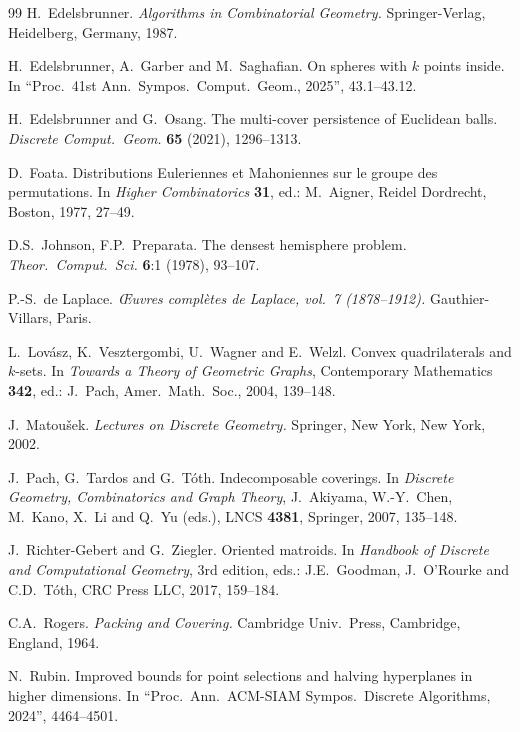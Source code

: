 \documentclass[10pt,a4paper]{article}
\theoremstyle{plain}
\begin{document}
\begin{thebibliography}{99}
{\sc H.\ Edelsbrunner.}
\emph{Algorithms in Combinatorial Geometry.}
Springer-Verlag, Heidelberg, Germany, 1987.

{\sc H.\ Edelsbrunner, A.\ Garber and M.\ Saghafian.}
On spheres with $k$ points inside.
In ``Proc.\ 41st Ann.\ Sympos.\ Comput.\ Geom., 2025'', 43.1--43.12.

{\sc H.\ Edelsbrunner and G.\ Osang.}
The multi-cover persistence of Euclidean balls.
\emph{Discrete Comput.\ Geom.} {\bf 65} (2021), 1296--1313.

{\sc D.\ Foata.}
Distributions Euleriennes et Mahoniennes sur le groupe des permutations.
In \emph{Higher Combinatorics} {\bf 31}, ed.: M.\ Aigner, Reidel Dordrecht, Boston, 1977, 27--49.

{\sc D.S.\ Johnson, F.P.\ Preparata.}
The densest hemisphere problem. \emph{Theor.\ Comput.\ Sci.} {\bf 6}:1 (1978), 93--107.


{\sc P.-S.\ de Laplace.} 
\emph{{\OE}uvres compl\`etes de Laplace, vol.\ 7 (1878--1912).} Gauthier-Villars, Paris.

{\sc L.\ Lov\'asz, K.\ Vesztergombi, U.\ Wagner and E.\ Welzl.} Convex quadrilaterals and $k$-sets.
In \emph{Towards a Theory of Geometric Graphs}, Contemporary Mathematics {\bf 342}, ed.: J.\ Pach, Amer.\ Math.\ Soc., 2004,  139--148.

{\sc J.\ Matou\v{s}ek.}
\emph{Lectures on Discrete Geometry.}
Springer, New York, New York, 2002.

{\sc J.\ Pach, G.\ Tardos and G.\ T\'{o}th.}
Indecomposable coverings.
In \emph{Discrete Geometry, Combinatorics and Graph Theory}, J.\ Akiyama, W.-Y.\ Chen, M.\ Kano, X.\ Li and Q.\ Yu (eds.), LNCS {\bf 4381}, Springer, 2007, 135--148.

{\sc J.\ Richter-Gebert and G.\ Ziegler.}
Oriented matroids.
In \emph{Handbook of Discrete and Computational Geometry}, 3rd edition, eds.: J.E.\ Goodman, J.\ O'Rourke and C.D.\ T\'oth, CRC Press LLC, 2017, 159--184.

{\sc C.A.\ Rogers.}
\emph{Packing and Covering.}
Cambridge Univ.\ Press, Cambridge, England, 1964.

{\sc N.\ Rubin.}
Improved bounds for point selections and halving hyperplanes in higher dimensions.
In ``Proc.\ Ann.\ ACM-SIAM Sympos.\ Discrete Algorithms, 2024'', 4464--4501.


\end{thebibliography}
\end{document}
